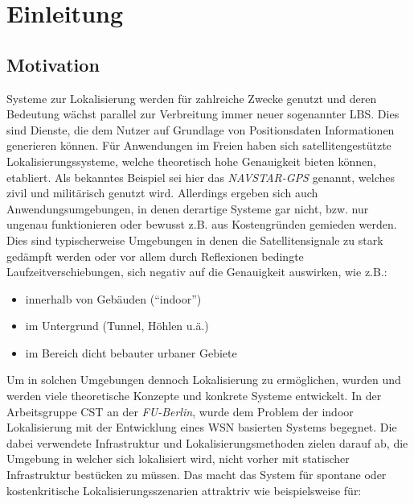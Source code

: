 \chapter{Einleitung}
\label{cha:einleitung}

\section{Motivation}
\label{sec:motivation}

Systeme zur Lokalisierung werden für zahlreiche Zwecke genutzt und deren
Bedeutung wächst parallel zur Verbreitung immer neuer sogenannter \gls{LBS}.
Dies sind Dienste, die dem Nutzer auf Grundlage von Positionsdaten
Informationen generieren können. Für Anwendungen im Freien haben sich
satellitengestützte Lokalisierungssysteme, welche theoretisch hohe Genauigkeit
bieten können, etabliert. Als bekanntes Beispiel sei hier das
\textit{NAVSTAR-GPS} genannt, welches zivil und militärisch genutzt wird.
Allerdings ergeben sich auch Anwendungsumgebungen, in denen derartige Systeme
gar nicht, bzw. nur ungenau funktionieren oder bewusst z.B. aus Kostengründen
gemieden werden. Dies sind typischerweise Umgebungen in denen die
Satellitensignale zu stark gedämpft werden oder vor allem durch Reflexionen
bedingte Laufzeitverschiebungen, sich negativ auf die Genauigkeit auswirken,
wie z.B.: 

\begin{itemize} 
  \item innerhalb von Gebäuden (``indoor'') 
  \item im Untergrund (Tunnel, Höhlen u.ä.) 
  \item im Bereich dicht bebauter urbaner Gebiete
\end{itemize}

Um in solchen Umgebungen dennoch Lokalisierung zu ermöglichen, wurden und werden
viele theoretische Konzepte und konkrete Systeme entwickelt. In der
Arbeitsgruppe \gls{CST} an der \textit{FU-Berlin}, wurde dem Problem der
indoor Lokalisierung mit der Entwicklung eines \gls{WSN} basierten Systems
begegnet. Die dabei verwendete Infrastruktur und Lokalisierungsmethoden zielen
darauf ab, die Umgebung in welcher sich lokalisiert wird, nicht vorher mit
statischer Infrastruktur bestücken zu müssen. Das macht das System für spontane
oder kostenkritische Lokalisierungsszenarien attraktriv wie beispielsweise für:

